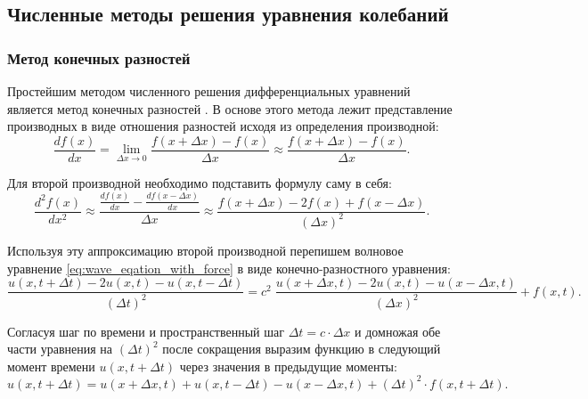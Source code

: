 \documentclass[12pt,a4paper,russian]{report}
\begin{document}
	
	\subsection{Численные методы решения уравнения колебаний}
	
	
	\subsubsection{Метод конечных разностей}
	
	Простейшим методом численного решения дифференциальных уравнений является метод конечных разностей \cite{Priklonski_NumMethods}. В основе этого метода лежит представление производных в виде отношения разностей исходя из определения производной:
	\begin{equation*}
		\frac{df(x)}{dx} = \lim\limits_{\Delta x \rightarrow 0} \frac{f(x + \Delta x) - f(x)}{\Delta x} \approx
		\frac{f(x + \Delta x) - f(x)}{\Delta x}.
	\end{equation*}
	
	Для второй производной необходимо подставить формулу саму в себя:
	\begin{equation} \label{eq:second_derivative}
		\frac{d^2 f(x)}{dx^2} \approx
		\frac{ \frac{df(x)}{dx} - \frac{df(x - \Delta x)}{dx}}{\Delta x} \approx
		\frac{ f(x + \Delta x) - 2 f(x) + f(x - \Delta x) }{\left( \Delta x \right) ^2}.
	\end{equation}
	
	Используя эту аппроксимацию второй производной перепишем волновое уравнение \eqref{eq:wave_eqation_with_force} в виде конечно-разностного уравнения:
	\begin{equation*}
		\frac{u(x, t + \Delta t) - 2 u(x, t) - u(x, t - \Delta t)}{\left( \Delta t \right) ^2} = 
		c^2 \; \frac{u(x + \Delta x, t) - 2 u(x, t) - u(x - \Delta x, t)}{\left( \Delta x \right) ^2} + f(x, t).
	\end{equation*}
	
	Согласуя шаг по времени и пространственный шаг $\Delta t = c \cdot \Delta x$ \cite{Tihonov_Urmatfiz} и домножая обе части уравнения на $ \left( \Delta t \right)^2 $ после сокращения выразим функцию в следующий момент времени $u(x, t + \Delta t)$ через значения в предыдущие моменты:
	\begin{equation*}		
		u(x, t + \Delta t) = u(x + \Delta x, t) + u(x, t - \Delta t) - u(x - \Delta x, t) + \left( \Delta t \right)^2 \cdot f(x, t + \Delta t).		
	\end{equation*}
	
\end{document}
